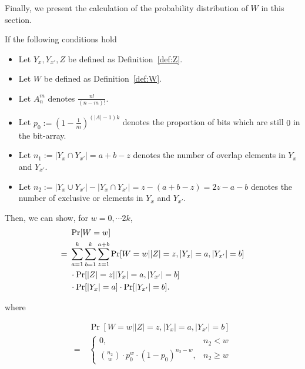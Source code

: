 Finally, we present the calculation of the probability distribution of $W$ in this section.
\begin{lemma}[Distribution of $W$]\label{lem:distribution_of_W}
If the following conditions hold
\begin{itemize}
    \item Let $Y_x, Y_{x'}, Z$ be defined as Definition~\ref{def:Z}.
    \item Let $W$ be defined as Definition~\ref{def:W}.
    \item Let $A_n^m$ denotes $\frac{n!}{(n - m)!}$. 
    \item Let $p_0 := (1 - \frac{1}{m})^{(|A| - 1)k}$ denotes the proportion of bits which are still $0$ in the bit-array.
    \item Let $n_1 := |Y_x \cap Y_{x'}|= a + b - z$ denotes the number of overlap elements in $Y_x$ and $Y_{x'}$. 
    \item Let $n_2 := |Y_x \cup Y_{x'}| - |Y_x \cap Y_{x'}| =  z  -(a + b - z) = 2z -a -b$ denotes the number of exclusive or elements in $Y_x$ and $Y_{x'}$.
\end{itemize}

Then, we can show, for $w=0, \cdots 2k$,
\begin{align*}
    & ~ \Pr[W = w] \notag \\
    = & ~ \sum_{a = 1}^k \sum_{b = 1}^k \sum_{z = 1}^{a+b} \Pr[W = w | |Z| = z, |Y_x| = a, |Y_{x'}| = b] \notag \\
    & ~ \cdot \Pr[|Z| = z | |Y_x| = a, |Y_{x'}| = b] \\
    & ~ \cdot \Pr[|Y_x| = a] \cdot  \Pr[|Y_{x'}| = b].
\end{align*}

where

\begin{align*}
    & ~ \Pr[W = w | |Z| = z, |Y_x| = a, |Y_{x'}| = b] \\
    = & ~
    \begin{cases}
        0,  &  n_2 < w \\
        \binom{n_2}{w} \cdot p_0^w \cdot (1 - p_0)^{n_2 - w}, & n_2 \geq w
    \end{cases}
\end{align*}
\end{lemma}

